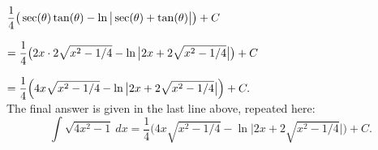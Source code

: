 \begin{example}
\noindent $\displaystyle \frac14\big(\sec(\theta)\tan(\theta) -\ln\big|\sec(\theta)+\tan(\theta)\big|\big)+C $

\noindent $\displaystyle = \frac14\big(2x\cdot 2\sqrt{x^2-1/4} - \ln\big|2x + 2\sqrt{x^2-1/4}\big|\big)+C$

\noindent $\displaystyle = \frac14\Big(4x\sqrt{x^2-1/4} - \ln\big|2x + 2\sqrt{x^2-1/4}\big|\Big)+C.$\\
 
The final answer is given in the last line above, repeated here:
$$\int \sqrt{4x^2-1}\ dx = \frac14\Big(4x\sqrt{x^2-1/4} - \ln\big|2x + 2\sqrt{x^2-1/4}\big|\Big)+C.$$

\end{example}